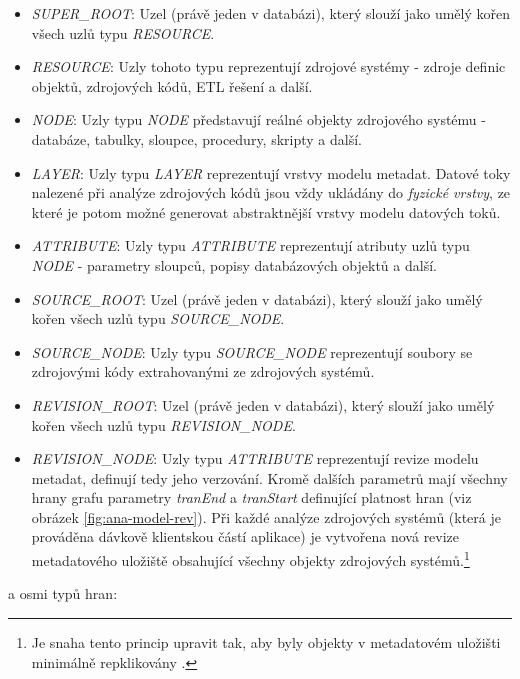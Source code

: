 \begin{itemize}
	\item{\textit{SUPER\_ROOT}}: Uzel (právě jeden v databázi), který slouží jako umělý kořen všech uzlů typu \textit{RESOURCE}. 
	\item{\textit{RESOURCE}}: Uzly tohoto typu reprezentují zdrojové systémy - zdroje definic objektů, zdrojových kódů, ETL řešení a další.  
	\item{\textit{NODE}}: Uzly typu \textit{NODE} představují reálné objekty zdrojového systému - databáze, tabulky, sloupce, procedury, skripty a další. 
	\item{\textit{LAYER}}: Uzly typu \textit{LAYER} reprezentují vrstvy modelu metadat. Datové toky nalezené při analýze zdrojových kódů jsou vždy ukládány do \textit{fyzické vrstvy}, ze které je potom možné generovat abstraktnější vrstvy modelu datových toků.  
	\item{\textit{ATTRIBUTE}}: Uzly typu \textit{ATTRIBUTE} reprezentují atributy uzlů typu \textit{NODE} - parametry sloupců, popisy databázových objektů a další.
	\item{\textit{SOURCE\_ROOT}}: Uzel (právě jeden v databázi), který slouží jako umělý kořen všech uzlů typu \textit{SOURCE\_NODE}. 
	\item{\textit{SOURCE\_NODE}}: Uzly typu \textit{SOURCE\_NODE} reprezentují soubory se zdrojovými kódy extrahovanými ze zdrojových systémů. 
	\item{\textit{REVISION\_ROOT}}: Uzel (právě jeden v databázi), který slouží jako umělý kořen všech uzlů typu \textit{REVISION\_NODE}. 
	\item{\textit{REVISION\_NODE}}: Uzly typu \textit{ATTRIBUTE} reprezentují revize modelu metadat, definují tedy jeho verzování. Kromě dalších parametrů mají všechny hrany grafu parametry \textit{tranEnd} a \textit{tranStart} definující platnost hran (viz obrázek \ref{fig:ana-model-rev}). Při každé analýze zdrojových systémů (která je prováděna dávkově klientskou částí aplikace) je vytvořena nová revize metadatového uložiště obsahující všechny objekty zdrojových systémů.\footnote{Je snaha tento princip upravit tak, aby byly objekty v metadatovém uložišti minimálně repklikovány \cite{Sykora17}.}  
\end{itemize}

 a osmi typů hran:

